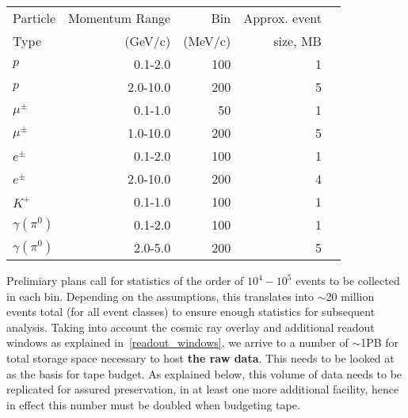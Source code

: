 \begin{center}
\begin{tabular}[h]{|l|r|r|r|r|}
  \hline
 Particle & Momentum Range& Bin         & Approx. event \\ %
 Type    &  (GeV/c)                 & (MeV/c) & size, MB \\ %
  \hline
  $p$ & 0.1-2.0 & 100 & 1 \\ %
  $p$ & 2.0-10.0 & 200 & 5 \\ %
  \hline
   $\mu^{\pm}$ & 0.1-1.0 & 50  & 1 \\ %
   $\mu^{\pm}$ & 1.0-10.0 & 200  & 5 \\ %
  \hline
   $e^{\pm}$ & 0.1-2.0 & 100 & 1  \\ %
   $e^{\pm}$ & 2.0-10.0 & 200  & 4 \\ %
  \hline
   $K^{+}$ & 0.1-1.0 & 100 & 1  \\ %
  \hline
   $\gamma(\pi^{0})$ & 0.1-2.0 & 100  & 1 \\ %
   $\gamma(\pi^{0})$ & 2.0-5.0 & 200  & 5 \\ %
  \hline
\end{tabular}
\end{center}

Prelimiary plans call for statistics of the order of $10^4 - 10^5$  events to be collected in each bin.
Depending on the assumptions, this translates into $\sim$20 million events total (for all event classes) to ensure enough statistics for subsequent analysis.
Taking into account the cosmic ray overlay and additional readout windows as explained in~\ref{readout_windows}, we arrive to a number
of $\sim$1PB for total storage space necessary to host \textbf{the raw data}. This needs to be looked at as the basis for tape budget. As explained below, this
volume of data needs to be replicated for assured preservation, in at least one more additional facility, hence in effect this number must be doubled when budgeting
tape.

